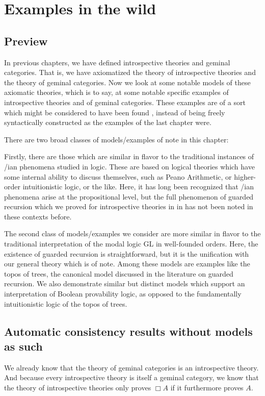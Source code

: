 \filestart

\section{Examples in the wild}

\subsection{Preview}
In previous chapters, we have defined introspective theories and geminal categories. That is, we have axiomatized the theory of introspective theories and the theory of geminal categories. Now we look at some notable models of these axiomatic theories, which is to say, at some notable specific examples of introspective theories and of geminal categories. These examples are of a sort which might be considered to have been found , instead of being freely syntactically constructed as the examples of the last chapter were.

There are two broad classes of models/examples of note in this chapter:

Firstly, there are those which are similar in flavor to the traditional instances of \Goedel/ian phenomena studied in logic. These are based on logical theories which have some internal ability to discuss themselves, such as Peano Arithmetic, or higher-order intuitionistic logic, or the like. Here, it has long been recognized that \Goedel/ian phenomena arise at the propositional level, but the full phenomenon of guarded recursion which we proved for introspective theories in \TODO in has not been noted in these contexts before.

The second class of models/examples we consider are more similar in flavor to the traditional interpretation of the modal logic GL in well-founded orders. Here, the existence of guarded recursion is straightforward, but it is the unification with our general theory which is of note. Among these models are examples like the topos of trees, the canonical model discussed in the literature on guarded recursion. We also demonstrate similar but distinct models which support an interpretation of Boolean provability logic, as opposed to the fundamentally intuitionistic logic of the topos of trees.

\subsection{Automatic consistency results without models as such}
We already know that the theory of geminal categories is an introspective theory. And because every introspective theory is itself a geminal category, we know that the theory of introspective theories only proves $\Box A$ if it furthermore proves $A$.

